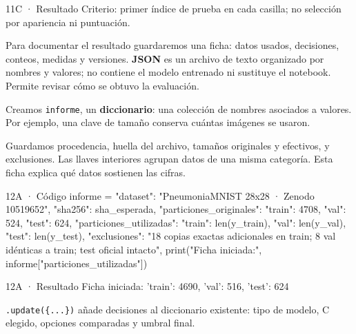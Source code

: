 
\begin{Salida}{11C · Resultado}
Criterio: primer índice de prueba en cada casilla; no selección por apariencia ni puntuación.
\end{Salida}

\label{bloque-12}

Para documentar el resultado guardaremos una ficha: datos usados, decisiones, conteos, medidas y versiones. \textbf{JSON} es un archivo de texto organizado por nombres y valores; no contiene el modelo entrenado ni sustituye el notebook. Permite revisar cómo se obtuvo la evaluación.


\label{paso-12a}

Creamos \texttt{\small informe}, un \textbf{diccionario}: una colección de nombres asociados a valores. Por ejemplo, una clave de tamaño conserva cuántas imágenes se usaron.

Guardamos procedencia, huella del archivo, tamaños originales y efectivos, y exclusiones. Las llaves interiores agrupan datos de una misma categoría. Esta ficha explica qué datos sostienen las cifras.


\begin{Codigo}{12A · Código}
informe = {
    "dataset": "PneumoniaMNIST 28x28 · Zenodo 10519652",
    "sha256": sha_esperada,
    "particiones_originales": {"train": 4708, "val": 524, "test": 624},
    "particiones_utilizadas": {"train": len(y_train), "val": len(y_val), "test": len(y_test)},
    "exclusiones": "18 copias exactas adicionales en train; 8 val idénticas a train; test oficial intacto",
}
print("Ficha iniciada:", informe["particiones_utilizadas"])
\end{Codigo}

\begin{Salida}{12A · Resultado}
Ficha iniciada: {'train': 4690, 'val': 516, 'test': 624}
\end{Salida}

\label{paso-12b}

\texttt{\small .\allowbreak{}update(\allowbreak{}\{.\allowbreak{}.\allowbreak{}.\allowbreak{}\})\allowbreak{}} añade decisiones al diccionario existente: tipo de modelo, C elegido, opciones comparadas y umbral final.


